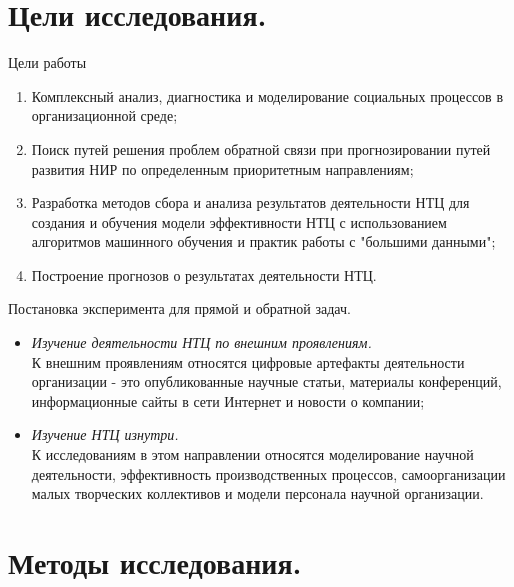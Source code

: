\documentclass{beamer}
\begin{document}
\section{Цели исследования.}

\begin{frame}{Цели работы}
\begin{enumerate}
	\item Комплексный анализ, диагностика и моделирование социальных процессов в организационной среде;
	\item Поиск путей решения проблем обратной связи при прогнозировании путей развития НИР по определенным приоритетным направлениям;
	\item Разработка методов сбора и анализа результатов деятельности НТЦ для создания и обучения модели эффективности НТЦ с использованием алгоритмов машинного обучения и практик работы с "большими данными";
	\item Построение прогнозов о результатах деятельности НТЦ.
\end{enumerate}
\end{frame}

\begin{frame}{Постановка эксперимента для прямой и обратной задач.}
	
	\begin{itemize}
		\item \textit{Изучение деятельности НТЦ по внешним проявлениям.} \\
		К внешним проявлениям относятся цифровые артефакты деятельности организации - это опубликованные научные статьи, материалы конференций, информационные сайты в сети Интернет и новости о компании;
		\item \textit{Изучение НТЦ изнутри.} \\
		К исследованиям в этом направлении относятся моделирование научной деятельности, эффективность производственных процессов, самоорганизации малых творческих коллективов и модели персонала научной организации.
	\end{itemize}
\end{frame}

\section{Методы исследования.}
\end{document}
